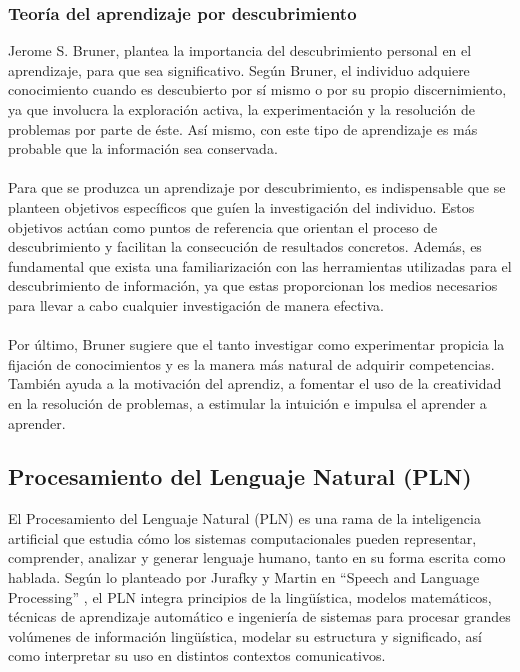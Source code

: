 \subsubsection{Teoría del aprendizaje por descubrimiento}
Jerome S. Bruner, plantea la importancia del descubrimiento personal en el aprendizaje, para que sea significativo. Según Bruner, el individuo adquiere conocimiento cuando es descubierto por sí mismo o por su propio discernimiento, ya que involucra la exploración activa, la experimentación y la resolución de problemas por parte de éste. Así mismo, con este tipo de aprendizaje es más probable que la información sea conservada.
\\
\\
Para que se produzca un aprendizaje por descubrimiento, es indispensable que se planteen objetivos específicos que guíen la investigación del individuo.  Estos objetivos actúan como puntos de referencia que orientan el proceso de descubrimiento y facilitan la consecución de resultados concretos. Además, es fundamental que exista una familiarización con las herramientas utilizadas para el descubrimiento de información, ya que estas proporcionan los medios necesarios para llevar a cabo cualquier investigación de manera efectiva. 
\\
\\
Por último, Bruner sugiere que el tanto investigar como experimentar propicia la fijación de conocimientos y es la manera más natural de adquirir competencias. También ayuda a la motivación del aprendiz, a fomentar el uso de la creatividad en la resolución de problemas, a estimular la intuición e impulsa el aprender a aprender. 

\subsection{Procesamiento del Lenguaje Natural (PLN)}
El Procesamiento del Lenguaje Natural (PLN) es una rama de la inteligencia artificial que estudia cómo los sistemas computacionales pueden representar, comprender, analizar y generar lenguaje humano, tanto en su forma escrita como hablada. Según lo planteado por Jurafky y Martin en “Speech and Language Processing” \cite{JurafskyMartin2023}, el PLN integra principios de la lingüística, modelos matemáticos, técnicas de aprendizaje automático e ingeniería de sistemas para procesar grandes volúmenes de información lingüística, modelar su estructura y significado, así como interpretar su uso en distintos contextos comunicativos.


